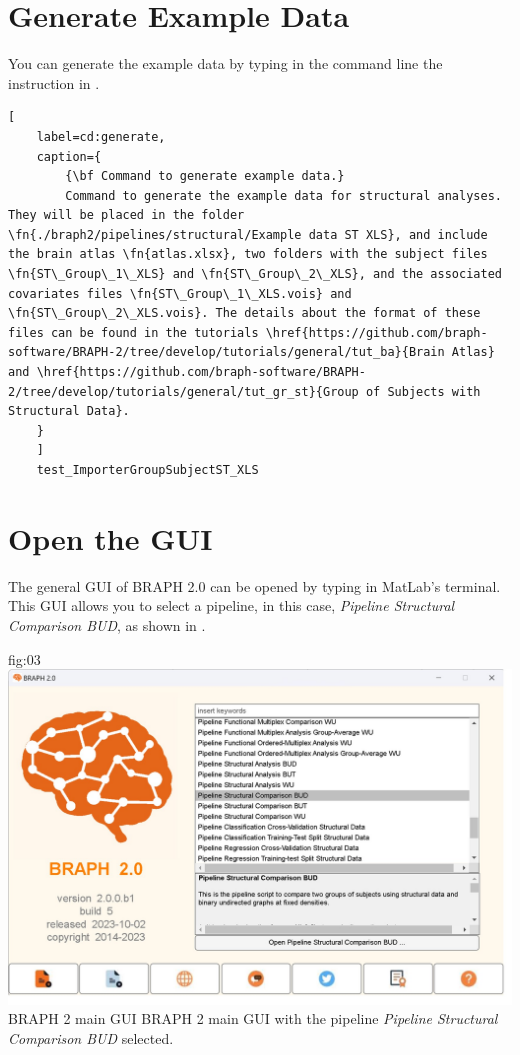 \documentclass[justified]{tufte-handout}
\begin{document}
\clearpage

\section{Generate Example Data}

You can generate the example data by typing in the command line the instruction in .
%
\begin{lstlisting}[
	label=cd:generate,
	caption={
		{\bf Command to generate example data.}
		Command to generate the example data for structural analyses. They will be placed in the folder \fn{./braph2/pipelines/structural/Example data ST XLS}, and include the brain atlas \fn{atlas.xlsx}, two folders with the subject files \fn{ST\_Group\_1\_XLS} and \fn{ST\_Group\_2\_XLS}, and the associated covariates files \fn{ST\_Group\_1\_XLS.vois} and \fn{ST\_Group\_2\_XLS.vois}. The details about the format of these files can be found in the tutorials \href{https://github.com/braph-software/BRAPH-2/tree/develop/tutorials/general/tut_ba}{Brain Atlas} and \href{https://github.com/braph-software/BRAPH-2/tree/develop/tutorials/general/tut_gr_st}{Group of Subjects with Structural Data}.
	}
	]
	test_ImporterGroupSubjectST_XLS
\end{lstlisting}


\section{Open the GUI}

The general GUI of BRAPH 2.0 can be opened by typing  in MatLab's terminal. This GUI allows you to select a pipeline, in this case, \emph{Pipeline Structural Comparison BUD}, as shown in .

{fig:03}
{
	\includegraphics{fig03.jpg}
}
{BRAPH 2 main GUI}
{
	BRAPH 2 main GUI with the pipeline \emph{Pipeline Structural Comparison BUD} selected.
}
\end{document}
